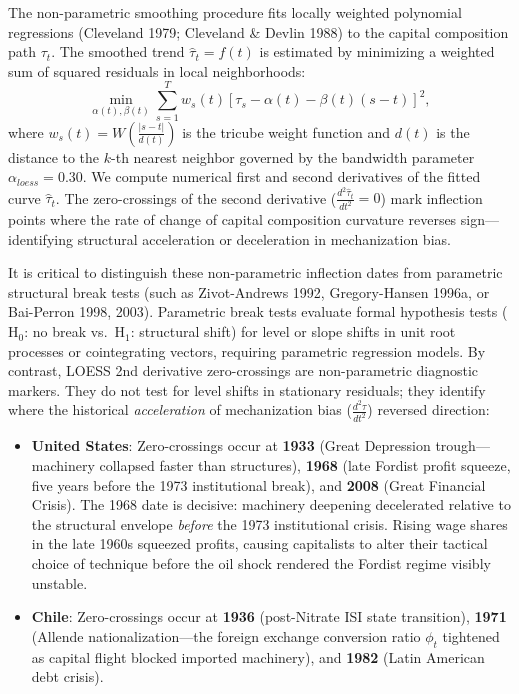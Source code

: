 \documentclass[11pt,a4paper]{article}
\begin{document}
The non-parametric smoothing procedure fits locally weighted polynomial regressions (Cleveland 1979; Cleveland \& Devlin 1988) to the capital composition path $\tau_t$. The smoothed trend $\hat{\tau}_t = f(t)$ is estimated by minimizing a weighted sum of squared residuals in local neighborhoods:
\begin{equation}
\min_{\alpha(t), \beta(t)} \sum_{s=1}^T w_s(t) \left[ \tau_s - \alpha(t) - \beta(t)(s - t) \right]^2,
\end{equation}
where $w_s(t) = W\left( \frac{|s - t|}{d(t)} \right)$ is the tricube weight function and $d(t)$ is the distance to the $k$-th nearest neighbor governed by the bandwidth parameter $\alpha_{loess} = 0.30$. We compute numerical first and second derivatives of the fitted curve $\hat{\tau}_t$. The zero-crossings of the second derivative ($\frac{d^2 \hat{\tau}_t}{dt^2} = 0$) mark inflection points where the rate of change of capital composition curvature reverses sign---identifying structural acceleration or deceleration in mechanization bias.

It is critical to distinguish these non-parametric inflection dates from parametric structural break tests (such as Zivot-Andrews 1992, Gregory-Hansen 1996a, or Bai-Perron 1998, 2003). Parametric break tests evaluate formal hypothesis tests ($\text{H}_0$: no break vs.\ $\text{H}_1$: structural shift) for level or slope shifts in unit root processes or cointegrating vectors, requiring parametric regression models. By contrast, LOESS 2nd derivative zero-crossings are non-parametric diagnostic markers. They do not test for level shifts in stationary residuals; they identify where the historical \textit{acceleration} of mechanization bias ($\frac{d^2 \tau}{dt^2}$) reversed direction:
\begin{itemize}
    \item \textbf{United States}: Zero-crossings occur at \textbf{1933} (Great Depression trough---machinery collapsed faster than structures), \textbf{1968} (late Fordist profit squeeze, five years before the 1973 institutional break), and \textbf{2008} (Great Financial Crisis). The 1968 date is decisive: machinery deepening decelerated relative to the structural envelope \textit{before} the 1973 institutional crisis. Rising wage shares in the late 1960s squeezed profits, causing capitalists to alter their tactical choice of technique before the oil shock rendered the Fordist regime visibly unstable.
    \item \textbf{Chile}: Zero-crossings occur at \textbf{1936} (post-Nitrate ISI state transition), \textbf{1971} (Allende nationalization---the foreign exchange conversion ratio $\phi_t$ tightened as capital flight blocked imported machinery), and \textbf{1982} (Latin American debt crisis).
\end{itemize}
\end{document}
